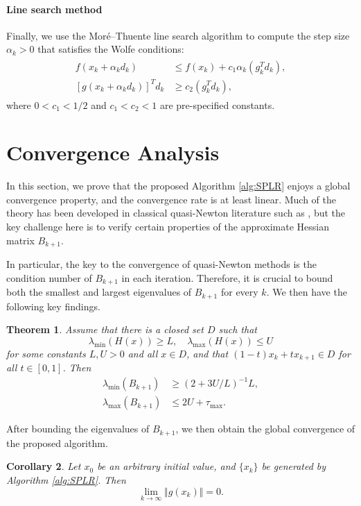 \documentclass{article}
\theoremstyle{plain}
\newtheorem{theorem}{Theorem}[section]
\newtheorem{corollary}[theorem]{Corollary}
\theoremstyle{definition}
\theoremstyle{remark}
\begin{document}
\paragraph{Line search method}
Finally, we use the Mor\'e--Thuente line search algorithm \citep{more1994line} to compute the step size $\alpha_k>0$ that satisfies the Wolfe conditions:
\begin{align}
\label{eq:wolfe}
\begin{split}
f(x_{k}+\alpha_{k}d_{k}) & \le f(x_{k})+c_{1}\alpha_{k}(g_{k}^{T}d_{k}),\\{}
[g(x_{k}+\alpha_{k}d_{k})]^{T}d_{k} & \ge c_{2}(g_{k}^{T}d_{k}),
\end{split}
\end{align}
where $0<c_1<1/2$ and $c_1<c_2<1$ are pre-specified constants.


\section{Convergence Analysis}
\label{sec:convergence}
In this section, we prove that the proposed Algorithm \ref{alg:SPLR} enjoys a global convergence property, and the convergence rate is at least linear. Much of the theory has been developed in classical quasi-Newton literature such as \citet{byrd1987global}, but the key challenge here is to verify certain properties of the approximate Hessian matrix $B_{k+1}$.

In particular, the key to the convergence of quasi-Newton methods is the condition number of $B_{k+1}$ in each iteration. Therefore, it is crucial to bound both the smallest and largest eigenvalues of $B_{k+1}$ for every $k$.
We then have the following key findings.

\begin{theorem}
\label{thm:eigenvalue_B}
Assume that there is a closed set $D$ such that
\[
\lambda_{\min}(H(x))\ge L,\quad\lambda_{\max}(H(x))\le U
\]
for some constants $L,U>0$ and all $x\in D$, and that $(1-t)x_k+t x_{k+1}\in D$ for all $t\in [0,1]$. Then
\begin{align*}
\lambda_{\min}(B_{k+1}) & \ge (2+3U/L)^{-1}L,\\
\lambda_{\max}(B_{k+1}) & \le 2U+\tau_{\max}.
\end{align*}
\end{theorem}

After bounding the eigenvalues of $B_{k+1}$, we then obtain the global convergence of the proposed algorithm.

\begin{corollary}
\label{cor:global_convergence}
Let $x_0$ be an arbitrary initial value, and $\{x_k\}$ be generated by Algorithm \ref{alg:SPLR}. Then
\[
\lim_{k\rightarrow\infty} \Vert g(x_k) \Vert = 0.
\]
\end{corollary}
\end{document}
